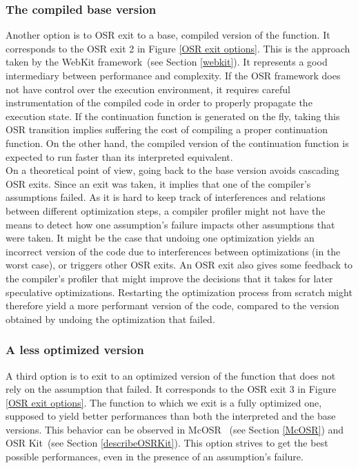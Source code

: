 \subsubsection{The compiled base version}
Another option is to OSR exit to a base, compiled version of the function.
It corresponds to the OSR exit 2 in Figure \ref{OSR exit options}.
This is the approach taken by the WebKit framework~\cite{WebKitURL}(see Section \ref{webkit}).
It represents a good intermediary between performance and complexity.
If the OSR framework does not have control over the execution environment, it requires careful instrumentation of the compiled code in order to properly propagate the execution state.
If the continuation function is generated on the fly, taking this OSR transition implies suffering the cost of compiling a proper continuation function.
On the other hand, the compiled version of the continuation function is expected to run faster than its interpreted equivalent.\\

On a theoretical point of view, going back to the base version avoids cascading OSR exits.
Since an exit was taken, it implies that one of the compiler's assumptions failed.
As it is hard to keep track of interferences and relations between different optimization steps, a compiler profiler might not have the means to detect how one assumption's failure impacts other assumptions that were taken.
It might be the case that undoing one optimization yields an incorrect version of the code due to interferences between optimizations (in the worst case), or triggers other OSR exits.
An OSR exit also gives some feedback to the compiler's profiler that might improve the decisions that it takes for later speculative optimizations.
Restarting the optimization process from scratch might therefore yield a more performant version of the code, compared to the version obtained by undoing the optimization that failed.\\

\subsubsection{A less optimized version}
A third option is to exit to an optimized version of the function that does not rely on the assumption that failed.
It corresponds to the OSR exit 3 in Figure \ref{OSR exit options}.
The function to which we exit is a fully optimized one, supposed to yield better performances than both the interpreted and the base versions.
This behavior can be observed in McOSR~\cite{lameed2013modular} (see Section \ref{McOSR}) and OSR Kit~\cite{OSRKit}(see Section \ref{describeOSRKit}).
This option strives to get the best possible performances, even in the presence of an assumption's failure.\\

